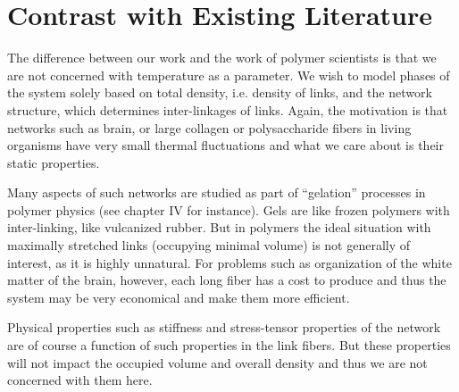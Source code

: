 \documentclass[nofootinbib,preprint,floatfix,titlepage,superscriptaddress]{revtex4} %
\newcommand{\outNim}[1]{}
\begin{document}
\outNim{
\subsection{Other links}

We will implement the curved-space rubber-band similar to flat space. The repulsive force from other links is a function of their geodesic distance, but that is hard to calculate in curved space. Since we assume the force to be short-ranged, we will use a constant metric, based on the midpoint between the two points to calculate the distance between the two points and won't use accurate geodesic distance. 

Also, we will add this repulsive force directly as a force on the l.h.s. of the geodesic equation and won't try to incorporate it into the metric and derive perturbed Christoffel symbols. 
Thus we will only need to define a global metric function.  

}



\section{Contrast with Existing Literature}
The difference between our work and the work of polymer scientists is that we are not concerned with temperature as a parameter. We wish to model phases of the system solely based on total density, i.e. density of links, and the network structure, which determines inter-linkages of links. Again, the motivation is that networks such as brain, or large collagen or polysaccharide fibers in living organisms have very small thermal fluctuations and what we care about is their static properties.

Many aspects of such networks are studied  as part of ``gelation'' processes in polymer physics (see \cite{de1979scaling} chapter IV for instance). Gels are like frozen polymers with inter-linking, like vulcanized rubber. But in polymers the ideal situation with maximally stretched links (occupying minimal volume) is not generally of interest, as it is highly unnatural. For problems such as organization of the white matter of the brain, however, each long fiber has a cost to produce and thus the system may be very economical and make them more efficient.

Physical properties such as stiffness and stress-tensor properties of the network are of course a function of such properties in the link fibers. But these properties will not impact the occupied volume and overall density and thus we are not concerned with them here. 
\end{document}
